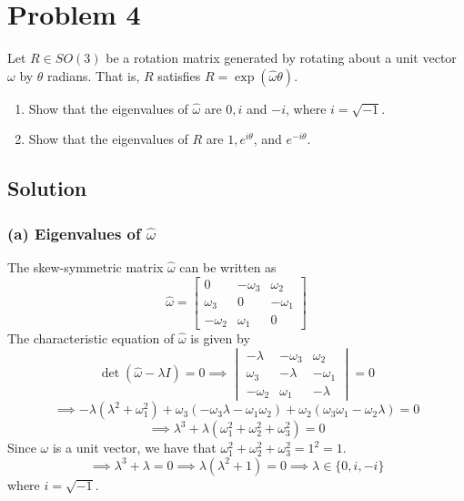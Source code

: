\section*{Problem 4}

Let \(R \in S O(3)\) be a rotation matrix generated by rotating about a unit vector \(\omega \) by \(\theta \) radians.
That is, \(R\) satisfies \(R=\exp (\hat{\omega} \theta)\).
\begin{enumerate}[label= (\alph*)]
    \item Show that the eigenvalues of \(\hat{\omega}\) are \(0, i\) and \(-i\), where \(i=\sqrt{-1}\).
    \item Show that the eigenvalues of \(R\) are \(1, e^{i \theta}\), and \(e^{-i \theta}\).
\end{enumerate}

\subsection*{Solution}

\subsubsection*{(a) Eigenvalues of \(\hat{\omega}\)}

The skew-symmetric matrix \(\hat{\omega}\) can be written as
\[
    \hat{\omega} = \begin{bmatrix}
        0           & -\omega_{3} & \omega_{2}  \\
        \omega_{3}  & 0           & -\omega_{1} \\
        -\omega_{2} & \omega_{1}  & 0
    \end{bmatrix}
\]
The characteristic equation of \(\hat{\omega}\) is given by
\[
    \det(\hat{\omega} - \lambda I) = 0
    \implies
    \begin{vmatrix}
        -\lambda    & -\omega_{3} & \omega_{2}  \\
        \omega_{3}  & -\lambda    & -\omega_{1} \\
        -\omega_{2} & \omega_{1}  & -\lambda
    \end{vmatrix}
    = 0
\]
\[
    \implies
    -\lambda (\lambda^{2} + \omega_{1}^{2}) + \omega_{3} (-\omega_{3} \lambda - \omega_{1} \omega_{2}) + \omega_{2} (\omega_{3} \omega_{1} - \omega_{2} \lambda) = 0
\]
\[
    \implies
    \lambda^{3} + \lambda (\omega_{1}^{2} + \omega_{2}^{2} + \omega_{3}^{2}) = 0
\]
Since \( \omega \) is a unit vector, we have that \( \omega_{1}^{2} + \omega_{2}^{2} + \omega_{3}^{2} = 1^2 = 1 \).
\[
    \implies
    \lambda^{3} + \lambda = 0
    \implies
    \lambda (\lambda^{2} + 1) = 0
    \implies
    \lambda \in \{ 0, i, -i \}
\]
where \( i = \sqrt{-1} \).


